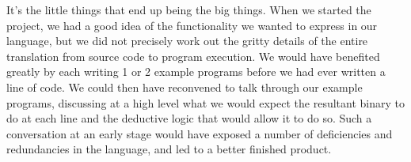 It's the little things that end up being the big things. When we started
the project, we had a good idea of the functionality we wanted to express
in our language, but we did not precisely work out the gritty details of
the entire translation from \sys{} source code to program execution. We
would have benefited greatly by each writing 1 or 2 example programs before
we had ever written a line of code. We could then have reconvened to talk
through our example programs, discussing at a high level what we would
expect the resultant binary to do at each line and the deductive logic that would
allow it to do so. Such a conversation at an early stage would have exposed
a number of deficiencies and redundancies in the language, and led to a
better finished product.
